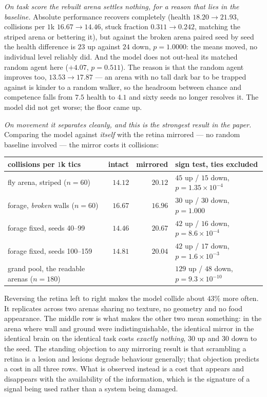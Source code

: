 \documentclass[10pt,twoside]{article}
\begin{document}
\emph{On task score the rebuilt arena settles nothing, for a reason that lies in
the baseline.} Absolute performance recovers completely (health $18.20\to21.93$,
collisions per $1$k $16.67\to14.46$, stuck fraction $0.311\to0.242$, matching
the striped arena or bettering it), but against the broken arena paired seed by
seed the health difference is $23$ up against $24$ down, $p=1.0000$: the means
moved, no individual level reliably did. And the model does not out-heal its
matched random agent here ($+4.07$, $p=0.511$). The reason is that the random
agent improves too, $13.53\to17.87$ --- an arena with no tall dark bar to be
trapped against is kinder to a random walker, so the headroom between chance and
competence falls from $7.5$ health to $4.1$ and sixty seeds no longer resolves
it. The model did not get worse; the floor came up.

\emph{On movement it separates cleanly, and this is the strongest result in the
paper.} Comparing the model against \emph{itself} with the retina mirrored ---
no random baseline involved --- the mirror costs it collisions:

\begin{center}
\small
\begin{tabular}{lrrl}
\toprule
collisions per $1$k tics & intact & mirrored & sign test, ties excluded\\
\midrule
fly arena, striped ($n=60$) & $14.12$ & $20.12$ & $45$ up / $15$ down, $p=1.35\times10^{-4}$\\
forage, \emph{broken} walls ($n=60$) & $16.67$ & $16.96$ & $30$ up / $30$ down, $p=1.000$\\
forage fixed, seeds 40--99 & $14.46$ & $20.67$ & $42$ up / $16$ down, $p=8.6\times10^{-4}$\\
forage fixed, seeds 100--159 & $14.81$ & $20.04$ & $42$ up / $17$ down, $p=1.6\times10^{-3}$\\
\midrule
grand pool, the readable arenas ($n=180$) & & & $129$ up / $48$ down, $p=9.3\times10^{-10}$\\
\bottomrule
\end{tabular}
\end{center}

Reversing the retina left to right makes the model collide about $43\%$ more
often. It replicates across two arenas sharing no texture, no geometry and no
food appearance. The middle row is what makes the other two mean something: in
the arena where wall and ground were indistinguishable, the identical mirror in
the identical brain on the identical task costs \emph{exactly nothing}, $30$ up
and $30$ down to the seed. The standing objection to any mirroring result is
that scrambling a retina is a lesion and lesions degrade behaviour generally;
that objection predicts a cost in all three rows. What is observed instead is a
cost that appears and disappears with the availability of the information, which
is the signature of a signal being used rather than a system being damaged.
\end{document}
